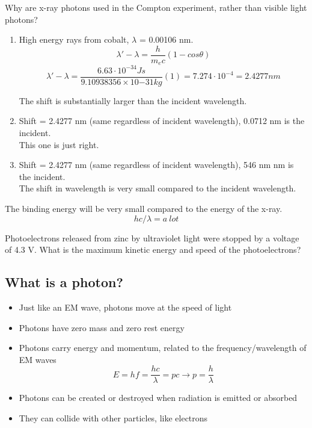 \documentclass[class=article,crop=false]{standalone}
\begin{document}
\newpage
\begin{question}
	Why are x-ray photons used in the Compton experiment, rather than visible light photons? \\
	\begin{answer}
		\begin{enumerate}
			\item High energy rays from cobalt, $\lambda$ = 0.00106 nm.\\
				$$ \lambda' - \lambda = \frac{h}{m_ec}(1-cos\theta) $$
				$$ \lambda' - \lambda = \frac{6.63 \cdot 10^{-34}Js}{9.10938356 × 10{-31} kg}(1) = 7.274 \cdot 10^{-4} = 2.4277 nm $$

				The shift is substantially larger than the incident wavelength. \\
			\item Shift = 2.4277 nm (same regardless of incident wavelength), 0.0712 nm is the incident.\\
				This one is just right.

			\item Shift = 2.4277 nm (same regardless of incident wavelength), 546 nm nm is the incident.\\
				The shift in wavelength is very small compared to the incident wavelength.
		\end{enumerate}
	\end{answer}
	\begin{answer}
		The binding energy will be very small compared to the energy of the x-ray.
		$$ hc/\lambda = a\ lot $$
	\end{answer}
\end{question}
\begin{question}
	Photoelectrons released from zinc by ultraviolet light were stopped by a voltage of 4.3 V.
What is the maximum kinetic energy and speed of the photoelectrons?
\end{question}

\subsection{What is a photon?}
\begin{itemize}
	\item Just like an EM wave, photons move at the speed of light
	\item Photons have zero mass and zero rest energy
	\item Photons carry energy and momentum, related to the frequency/wavelength of EM waves
		$$ E = hf = \frac{hc}{\lambda} = pc \rightarrow p = \frac{h}{\lambda} $$
	\item Photons can be created or destroyed when radiation is emitted or absorbed
	\item They can collide with other particles, like electrons
\end{itemize}
\end{document}
